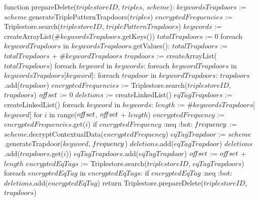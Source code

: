 function prepareDelete($triplestoreID$, $triples$, $scheme$):
    $keywordsTrapdoors$ := $scheme$.generateTriplePatternTrapdoors($triples$)
    $encryptedFrequencies$ := Triplestore.search($triplestoreID$, $triplePatternTrapdoors$)
    $keywords$ := createArrayList($\#keywordsTrapdoors$.getKeys())
    $totalTrapdoors$ := 0
    foreach $keywordTrapdoors$ in $keywordsTrapdoors$.getValues():
        $totalTrapdoors$ := $totalTrapdoors$ + $\#keywordTrapdoors$
    $trapdoors$ := createArrayList($totalTrapdoors$)
    foreach $keyword$ in $keywords$:
        foreach $keywordTrapdoors$ in $keywordsTrapdoors$[$keyword$]:
            foreach $trapdoor$ in $keywordTrapdoors$:
                $trapdoors$.add($trapdoor$)
    $encryptedFrequencies$ := Triplestore.search($triplestoreID$, $trapdoors$)
    $o\textrm{\emph{ff}}set$ := 0
    $deletions$ := createLinkedList()
    $eqTagTrapdoors$ := createLinkedList()
    foreach $keyword$ in $keywords$:
        $length$ := $\#keywordsTrapdoors$[$keyword$]
        for $i$ in range($o\textrm{\emph{ff}}set$, $o\textrm{\emph{ff}}set$ + $length$) 
            $encryptedFrequency$ := $encryptedFrequencies$.get($i$)
            if $encryptedFrequency$ :neq :bot:
                $\textrm{\emph{f}}requency$ := $scheme$.decryptContextualData($encryptedFrequency$)
                $eqTagTrapdoor$ := $scheme$.generateTrapdoor($keyword$, $\textrm{\emph{f}}requency$)
                $deletions$.add($eqTagTrapdoor$)
                $deletions$.add($trapdoors$.get($i$))
                $eqTagTrapdoors$.add($eqTagTrapdoor$)
        $o\textrm{\emph{ff}}set$ := $o\textrm{\emph{ff}}set$ + $length$
    $encryptedEqTags$ := Triplestore.search($triplestoreID$, $eqTagTrapdoors$)
    foreach $encryptedEqTag$ in $encryptedEqTags$:
        if $encryptedEqTag$ :neq :bot:
            $deletions$.add($encryptedEqTag$)
    return Triplestore.prepareDelete($triplestoreID$, $trapdoors$)